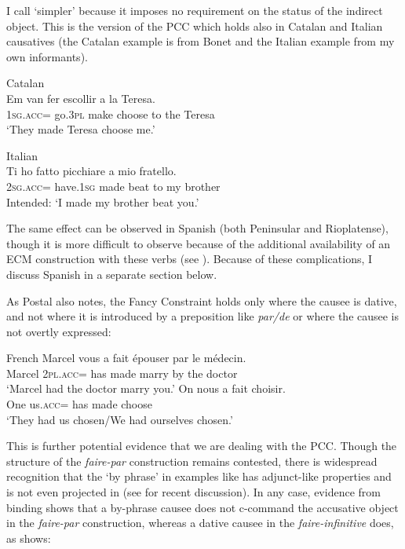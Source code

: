 \documentclass[output=paper,colorlinks,citecolor=brown,nonflat]{./langscibook}
\begin{document}
I call  ‘simpler’ because it imposes no requirement on the status of the indirect object. This is the version of the PCC which holds also in Catalan and Italian causatives (the Catalan example is from Bonet and the Italian example from my own informants). 

\ea%
    \label{ex:sheehan:17}
    Catalan \citep[195]{Bonet1991}\\
    \gll   *Em       van     fer     escollir   a   la   Teresa.\\
            \textsc{1sg}.\textsc{acc}=  go.\textsc{3pl}   make   choose   to   the   Teresa\\
    \glt ‘They made Teresa choose me.’
\z

\ea%
    \label{ex:sheehan:18}
    Italian\\
    \gll   *Ti     ho     fatto   picchiare     a   mio   fratello.\\
         \textsc{2sg}.\textsc{acc}=  have.\textsc{1sg}   made beat         to   my   brother\\
    \glt    Intended: ‘I made my brother beat you.’
\z

The same effect can be observed in Spanish (both Peninsular and Rioplatense), though it is more difficult to observe because of the additional availability of an ECM construction with these verbs (see \citealt{Strozer1976, Torrego2010}). Because of these complications, I discuss Spanish in a separate section below.  

As Postal also notes, the Fancy Constraint holds only where the causee is dative, and not where it is introduced by a preposition like \textit{par/de} or where the causee is not overtly expressed:

\ea%
    \label{ex:sheehan:19}
    French \citep[3]{Postal1989}
    \ea\label{ex:sheehan:19a}
    \gll    Marcel vous     a  fait   épouser   par   le   médecin.\\
            Marcel \textsc{2pl}.\textsc{acc}=  has  made   marry   by   the   doctor\\
    \glt ‘Marcel had the doctor marry you.’
    \ex\label{ex:sheehan:19b}
    \gll   On  nous     a   fait choisir.\\
            One   us.\textsc{acc}=  has   made choose\\
    \glt    ‘They had us chosen/We had ourselves chosen.’
    \z
\z

This is further potential evidence that we are dealing with the PCC. Though the structure of the \textit{faire-par} construction remains contested, there is widespread recognition that the ‘by phrase’ in examples like  has adjunct-like properties and is not even projected in  (see \citealt{Guasti1996, FolliHarley2007, SheehanCyrino2016} for recent discussion). In any case, evidence from binding shows that a by-phrase causee does not c-command the accusative object in the \textit{faire-par} construction, whereas a dative causee in the \textit{faire-infinitive} does, as \citet{Burzio1986} shows:
\end{document}

